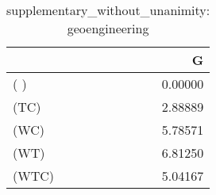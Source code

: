 \begin{table}
\centering
\caption{supplementary_without_unanimity: geoengineering}
\begin{tabular}{lr}
\toprule
{} &       G \\
\midrule
( )   & 0.00000 \\
(TC)  & 2.88889 \\
(WC)  & 5.78571 \\
(WT)  & 6.81250 \\
(WTC) & 5.04167 \\
\bottomrule
\end{tabular}
\end{table}
